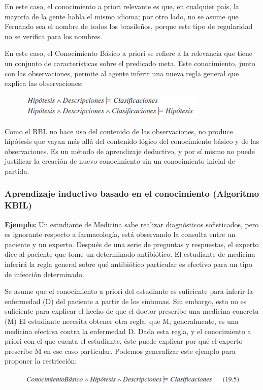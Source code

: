 \documentclass[12 pt, a4paper]{article}
\begin{document}
			En este caso, el conocimiento a priori relevante es que, en cualquier país, la mayoría de la gente habla el mismo idioma; por otro lado, no se asume que Fernando sea el nombre de todos los brasileños, porque este tipo de regularidad no se verifica para los nombres.

			En este caso, el Conocimiento Básico a priori se refiere a la relevancia que tiene un conjunto de características sobre el predicado meta. Este conocimiento, junto con las observaciones, permite al agente inferir una nueva regla general que explica las observaciones:
				\begin{figure}[h]
					\centering
					\includegraphics[width=0.8\textwidth]{./section2/fig4.png}
				\end{figure}
			
			Como el RBL no hace uso del contenido de las observaciones, no produce hipótesis que vayan más allá del contenido lógico del conocimiento básico y de las observaciones. Es un método de aprendizaje deductivo, y por sí mismo no puede justificar la creación de nuevo conocimiento sin un conocimiento inicial de partida.
			
			\subsubsection{Aprendizaje inductivo basado en el conocimiento (Algoritmo KBIL)}
			\textbf{Ejemplo:} Un estudiante de Medicina sabe realizar diagnósticos sofisticados, pero es ignorante respecto a farmacología, está observando la consulta entre un paciente y un experto. Después de una serie de preguntas y respuestas, el experto dice al paciente que tome un determinado antibiótico. El estudiante de medicina inferirá la regla general sobre qué antibiótico particular es efectivo para un tipo de infección determinado.
			
			Se asume que el conocimiento a priori del estudiante es suficiente para inferir la enfermedad (D) del paciente a partir de los síntomas. Sin embargo, esto no es suficiente para explicar el hecho de que el doctor prescribe una medicina concreta (M) El estudiante necesita obtener otra regla: que M, generalmente, es una medicina efectiva contra la enfermedad D. Dada esta regla, y el conocimiento a priori con el que cuenta el estudiante, éste puede explicar por qué el experto prescribe M en ese caso particular. Podemos generalizar este ejemplo para proponer la restricción:
				\begin{figure}[h]
					\centering
					\includegraphics[width=1\textwidth]{./section2/fig5.png}
				\end{figure}
			
\end{document}
